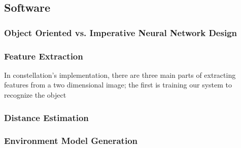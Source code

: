 \subsection{Software}
\subsubsection{Object Oriented vs. Imperative Neural Network Design}
\subsubsection{Feature Extraction}
In constellation's implementation, there are three main parts of extracting features from a two dimensional image; the first is training our system to recognize the object

\subsubsection{Distance Estimation}
\subsubsection{Environment Model Generation}